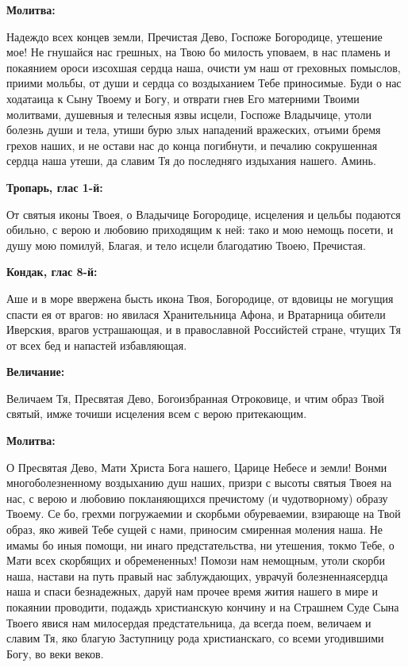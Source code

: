 \bfseries Молитва:\normalfont{}\nopagebreak


Надеждо всех концев земли, Пречистая Дево, Госпоже Богородице, утешение мое! Не гнушайся нас грешных, на Твою бо милость уповаем, в нас пламень и покаянием ороси изсохшая сердца наша, очисти ум наш от греховных помыслов, приими мольбы, от души и сердца со воздыханием Тебе приносимые. Буди о нас ходатаица к Сыну Твоему и Богу, и отврати гнев Его матерними Твоими молитвами, душевныя и телесныя язвы исцели, Госпоже Владычице, утоли болезнь души и тела, утиши бурю злых нападений вражеских, отъими бремя грехов наших, и не остави нас до конца погибнути, и печалию сокрушенная сердца наша утеши, да славим Тя до последняго издыхания нашего. Аминь.
\nopagebreak\bigskip\bigskip\mychapterending

 

\bfseries Тропарь, глас 1-й:\normalfont{}\nopagebreak


От святыя иконы Твоея, о Владычице Богородице, исцеления и цельбы подаются обильно, с верою и любовию приходящим к ней: тако и мою немощь посети, и душу мою помилуй, Благая, и тело исцели благодатию Твоею, Пречистая.


\medskip


\bfseries Кондак, глас 8-й:\normalfont{}\nopagebreak


Аше и в море ввержена бысть икона Твоя, Богородице, от вдовицы не могущия спасти ея от врагов: но явилася Хранительница Афона, и Вратарница обители Иверския, врагов устрашающая, и в православной Российстей стране, чтущих Тя от всех бед и напастей избавляющая.


\medskip


\bfseries Величание:\normalfont{}\nopagebreak


Величаем Тя, Пресвятая Дево, Богоизбранная Отроковице, и чтим образ Твой святый, имже точиши исцеления всем с верою притекающим.


\medskip


\bfseries Молитва:\normalfont{}\nopagebreak


О Пресвятая Дево, Мати Христа Бога нашего, Царице Небесе и земли! Вонми многоболезненному воздыханию душ наших, призри с высоты святыя Твоея на нас, с верою и любовию покланяющихся пречистому (и чудотворному) образу Твоему. Се бо, грехми погружаемии и скорбьми обуреваемии, взирающе на Твой образ, яко живей Тебе сущей с нами, приносим смиренная моления наша. Не имамы бо иныя помощи, ни инаго предстательства, ни утешения, токмо Тебе, о Мати всех скорбящих и обремененных! Помози нам немощным, утоли скорби наша, настави на путь правый нас заблуждающих, уврачуй болезненнаясердца наша и спаси безнадежных, даруй нам прочее время жития нашего в мире и покаянии проводити, подаждь христианскую кончину и на Страшнем Суде Сына Твоего явися нам милосердая предстательница, да всегда поем, величаем и славим Тя, яко благую Заступницу рода христианскаго, со всеми угодившими Богу, во веки веков. 
\nopagebreak\bigskip\bigskip\mychapterending


